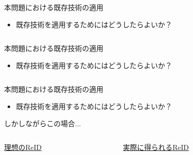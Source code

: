 \begin{frame}{本問題における既存技術の適用}
    \begin{itemize}
        \item 既存技術を適用するためにはどうしたらよいか？
    \end{itemize}
    \phantom{\ra しかしながらこの場合$\dots$}
    \vspace{-1zh}
    \vs
    \begin{columns}
        \begin{column}{.5\linewidth}
        \end{column}
        \begin{column}{.5\linewidth}
        \end{column}
    \end{columns}
\end{frame}
\begin{frame}[noframenumbering]{本問題における既存技術の適用}
    \begin{itemize}
        \item 既存技術を適用するためにはどうしたらよいか？
    \end{itemize}
    \vspace{-1zh}
    \phantom{\ra しかしながらこの場合$\dots$}
    \vs
    \begin{columns}
        \begin{column}{.5\linewidth}
        \end{column}
        \begin{column}{.5\linewidth}
        \end{column}
    \end{columns}
\end{frame}
\begin{frame}[noframenumbering]{本問題における既存技術の適用}
    \begin{itemize}
        \item 既存技術を適用するためにはどうしたらよいか？
    \end{itemize}
    \vspace{-1zh}
    \ra しかしながらこの場合$\dots$
    \vs
    \begin{columns}
        \begin{column}{.5\linewidth}
            \uline{理想のReID}
        \end{column}
        \begin{column}{.5\linewidth}
            \uline{実際に得られるReID}
        \end{column}
    \end{columns}
\end{frame}

